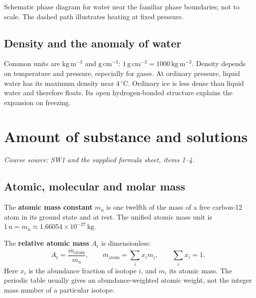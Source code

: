 \documentclass[a4paper,10pt]{article}
\newcommand{\source}[1]{{\small\textit{Course source: #1.}\par}}
\newcommand{\chemunit}[1]{\,\mathrm{#1}}
\newcommand{\chapterbreak}{\clearpage}
\begin{document}
\begin{center}

{\small Schematic phase diagram for water near the familiar phase boundaries;
not to scale. The dashed path illustrates heating at fixed pressure.}
\end{center}

\subsection{Density and the anomaly of water}
Common units are $\mathrm{kg\,m^{-3}}$ and $\mathrm{g\,cm^{-3}}$:
$1\chemunit{g\,cm^{-3}}=1000\chemunit{kg\,m^{-3}}$.
Density depends on temperature and pressure, especially for gases.
At ordinary pressure, liquid water has its maximum density near $4\,^{\circ}\mathrm C$.
Ordinary ice is less dense than liquid water and therefore floats. Its open
hydrogen-bonded structure explains the expansion on freezing.

\chapterbreak
\section{Amount of substance and solutions}
\label{sec:solutions}
\source{SW1 and the supplied formula sheet, items 1--4}

\subsection{Atomic, molecular and molar mass}
The \textbf{atomic mass constant} $m_{\mathrm u}$ is one twelfth of the mass of a
free carbon-12 atom in its ground state and at rest. The unified atomic mass unit
is $1\chemunit{u}=m_{\mathrm u}\approx1.66054\times10^{-27}\chemunit{kg}$.

The \textbf{relative atomic mass} $A_{\mathrm r}$ is dimensionless:
\[
 A_{\mathrm r}=\frac{\overline m_{\mathrm{atom}}}{m_{\mathrm u}},
 \qquad \overline m_{\mathrm{atom}}=\sum_i x_i m_i,
 \qquad \sum_i x_i=1.
\]
Here $x_i$ is the abundance fraction of isotope $i$, and $m_i$ its atomic mass.
The periodic table usually gives an abundance-weighted atomic weight, not the
integer mass number of a particular isotope.
\end{document}
